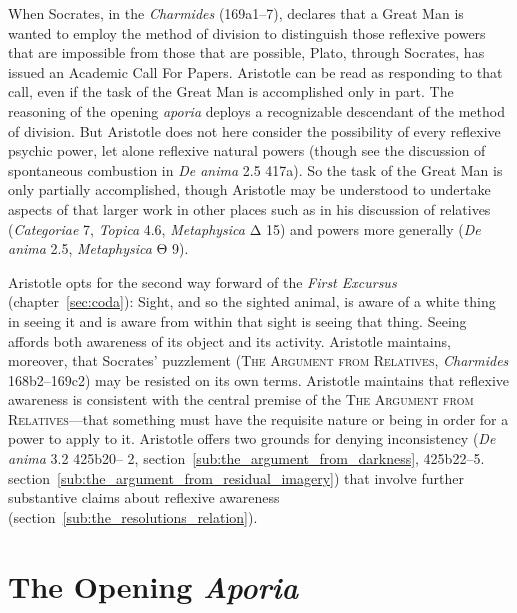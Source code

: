 When Socrates, in the \emph{Charmides} (169a1–7), declares that a Great Man is wanted to employ the method of division to distinguish those reflexive powers that are impossible from those that are possible, Plato, through Socrates, has issued an Academic Call For Papers. Aristotle can be read as responding to that call, even if the task of the Great Man is accomplished only in part. The reasoning of the opening \emph{aporia} deploys a recognizable descendant of the method of division. But Aristotle does not here consider the possibility of every reflexive psychic power, let alone reflexive natural powers (though see the discussion of spontaneous combustion in \emph{De anima} 2.5 417a). So the task of the Great Man is only partially accomplished, though Aristotle may be understood to undertake aspects of that larger work in other places such as in his discussion of relatives (\emph{Categoriae} 7, \emph{Topica} 4.6, \emph{Metaphysica} {\sbl Δ} 15) and powers more generally (\emph{De anima} 2.5, \emph{Metaphysica} {\sbl Θ} 9). 

Aristotle opts for the second way forward of the \emph{First Excursus} (chapter~\ref{sec:coda}): Sight, and so the sighted animal, is aware of a white thing in seeing it and is aware from within that sight is seeing that thing. Seeing affords both awareness of its object and its activity. Aristotle maintains, moreover, that Socrates' puzzlement (\textsc{The Argument from Relatives}, \emph{Charmides} 168b2–169c2) may be resisted on its own terms. Aristotle maintains that reflexive awareness is consistent with the central premise of the \textsc{The Argument from Relatives}—that something must have the requisite nature or being in order for a power to apply to it. Aristotle offers two grounds for denying inconsistency (\emph{De anima} 3.2 425b20–
2, section~\ref{sub:the_argument_from_darkness}, 425b22–5. section~\ref{sub:the_argument_from_residual_imagery}) that involve further substantive claims about reflexive awareness (section~\ref{sub:the_resolutions_relation}). 


\section{The Opening \emph{Aporia}} %
\label{sec:the_opening_aporia}

